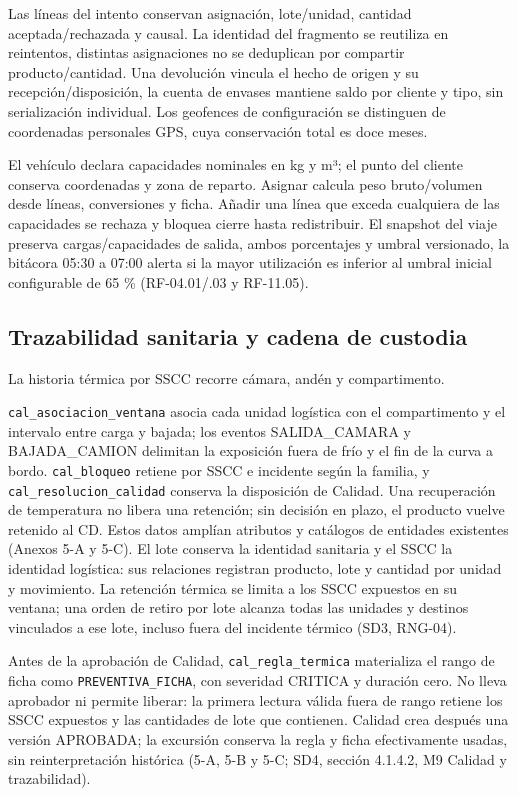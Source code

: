 Las líneas del intento conservan asignación, lote/unidad, cantidad aceptada/rechazada y causal. La identidad del fragmento se reutiliza en reintentos, distintas asignaciones no se deduplican por compartir producto/cantidad. Una devolución vincula el hecho de origen y su recepción/disposición, la cuenta de envases mantiene saldo por cliente y tipo, sin serialización individual. Los geofences de configuración se distinguen de coordenadas personales GPS, cuya conservación total es doce meses.

El vehículo declara capacidades nominales en kg y m³; el punto del cliente conserva coordenadas y zona de reparto. Asignar calcula peso bruto/volumen desde líneas, conversiones y ficha. Añadir una línea que exceda cualquiera de las capacidades se rechaza y bloquea cierre hasta redistribuir. El snapshot del viaje preserva cargas/capacidades de salida, ambos porcentajes y umbral versionado, la bitácora 05:30 a 07:00 alerta si la mayor utilización es inferior al umbral inicial configurable de 65 \% (RF-04.01/.03 y RF-11.05).

\subsection{Trazabilidad sanitaria y cadena de custodia}
\label{sec:sd5-5-1-7}

La historia térmica por SSCC recorre cámara, andén y compartimento.

\texttt{cal\_\allowbreak{}asociacion\_\allowbreak{}ventana} asocia cada unidad logística con el compartimento y el intervalo entre carga y bajada; los eventos SALIDA\_CAMARA y BAJADA\_CAMION delimitan la exposición fuera de frío y el fin de la curva a bordo. \texttt{cal\_\allowbreak{}bloqueo} retiene por SSCC e incidente según la familia, y \texttt{cal\_\allowbreak{}resolucion\_\allowbreak{}calidad} conserva la disposición de Calidad. Una recuperación de temperatura no libera una retención; sin decisión en plazo, el producto vuelve retenido al CD. Estos datos amplían atributos y catálogos de entidades existentes (Anexos 5-A y 5-C). El lote conserva la identidad sanitaria y el SSCC la identidad logística: sus relaciones registran producto, lote y cantidad por unidad y movimiento. La retención térmica se limita a los SSCC expuestos en su ventana; una orden de retiro por lote alcanza todas las unidades y destinos vinculados a ese lote, incluso fuera del incidente térmico (SD3, RNG-04).

Antes de la aprobación de Calidad, \texttt{cal\_\allowbreak{}regla\_\allowbreak{}termica} materializa el rango de ficha como \texttt{PREVENTIVA\_\allowbreak{}FICHA}, con severidad CRITICA y duración cero. No lleva aprobador ni permite liberar: la primera lectura válida fuera de rango retiene los SSCC expuestos y las cantidades de lote que contienen. Calidad crea después una versión APROBADA; la excursión conserva la regla y ficha efectivamente usadas, sin reinterpretación histórica (5-A, 5-B y 5-C; SD4, sección 4.1.4.2, M9 Calidad y trazabilidad).


